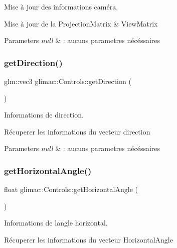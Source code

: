 Mise à jour des informations caméra. 

Mise à jour de la Projection\+Matrix \& View\+Matrix


\begin{DoxyParams}{Parameters}
{\em null} & \+: aucuns parametres nécéssaires \\
\hline
\end{DoxyParams}
\mbox{\label{classglimac_1_1Controls_acb5245c5972c2d065f693e6899b805f6}} 
\subsubsection{\texorpdfstring{get\+Direction()}{getDirection()}}
{\footnotesize\ttfamily glm\+::vec3 glimac\+::\+Controls\+::get\+Direction (\begin{DoxyParamCaption}{ }\end{DoxyParamCaption})}



Informations de direction. 

Récuperer les informations du vecteur direction


\begin{DoxyParams}{Parameters}
{\em null} & \+: aucuns parametres nécéssaires \\
\hline
\end{DoxyParams}
\mbox{\label{classglimac_1_1Controls_ae96ae04755ebbcf8528d8299a637225f}} 
\subsubsection{\texorpdfstring{get\+Horizontal\+Angle()}{getHorizontalAngle()}}
{\footnotesize\ttfamily float glimac\+::\+Controls\+::get\+Horizontal\+Angle (\begin{DoxyParamCaption}{ }\end{DoxyParamCaption})}



Informations de l\textquotesingle{}angle horizontal. 

Récuperer les informations du vecteur Horizontal\+Angle



